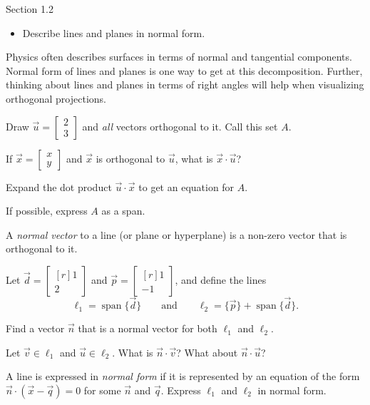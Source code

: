 \documentclass{problemset}
\DeclareMathOperator{\Span}{span}
\newcommand{\mat}[1]{\begin{bmatrix*}[r]#1\end{bmatrix*}}
\begin{document}
\begin{lesson}
	\newpage

	Section 1.2

	\begin{itemize}
		\item Describe lines and planes in normal form.
	\end{itemize}

	Physics often describes surfaces in terms of normal and tangential components.
	Normal form of lines and planes is one way to get at this decomposition. Further, thinking
	about lines and planes in terms of right angles will help when visualizing orthogonal projections.

	\newpage
\end{lesson}
	
	\question
	\begin{parts}
		\item Draw $\vec u=\begin{bmatrix}2\\3\end{bmatrix}$ and \emph{all}
		vectors orthogonal to it. Call this set $A$.
		\item If $\vec x=\begin{bmatrix}x\\y\end{bmatrix}$ and $\vec x$ is 
		orthogonal to $\vec u$, what is $\vec x\cdot \vec u$?
		\item Expand the dot product $\vec u\cdot \vec x$ to get an equation
		for $A$.
		\item If possible, express $A$ as a span.
	\end{parts}

	\begin{definition}
		A \emph{normal vector} to a line (or plane or hyperplane) is a non-zero vector that is orthogonal to it.
	\end{definition}

	\question
	Let $\vec d=\mat{1\\2}$ and $\vec p=\mat{1\\-1}$, and define the lines
	\[
		\ell_1 = \Span\{\vec d\}\qquad\text{and}\qquad \ell_2=\{\vec p\}+\Span\{\vec d\}.
	\]
	\begin{parts}
		\item Find a vector $\vec n$ that is a normal vector for both $\ell_1$ and
			$\ell_2$.
		\item Let $\vec v\in \ell_1$ and $\vec u\in \ell_2$.
			What is $\vec n\cdot \vec v$? What about $\vec n\cdot \vec u$?
		\item A line is expressed in \emph{normal form} if it is represented by an
			equation of the form $\vec n\cdot (\vec x-\vec q)=0$ for some $\vec n$ and 
			$\vec q$. Express $\ell_1$ and $\ell_2$ in normal form.
	\end{parts}
	
\end{document}
